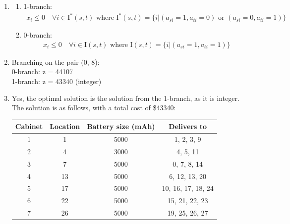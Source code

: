 \documentclass[10pt,a4paper]{article}
\begin{document}
\begin{enumerate}
\item 
\begin{enumerate}
	\item 1-branch:
	\begin{align*}
		x_i \leq 0 \quad \forall i \in \text{I}^*(s, t) \text{ where } \text{I}^*(s, t) = \{i | (a_{si} = 1, a_{ti} = 0) \text{ or } (a_{si} = 0, a_{ti} = 1)\}
	\end{align*}
	\item 0-branch:
	\begin{align*}
	x_i \leq 0 \quad \forall i \in \text{I}(s, t) \text{ where } \text{I}(s, t) = \{i | (a_{si} = 1, a_{ti} = 1)\}
	\end{align*}
\end{enumerate}

\item 
Branching on the pair (0, 8): \\
0-branch: z = 44107 \\
1-branch: z = 43340 (integer)

\item 
Yes, the optimal solution is the solution from the 1-branch, as it is integer. The solution is as follows, with a total cost of \$43340:

\begin{tabular}{|c|c|c|c|}
	\hline 
	Cabinet & Location & Battery size (mAh) & Delivers to \\ 
	\hline 
	1 & 1 & 5000 & 1, 2, 3, 9 \\ 
	\hline 
	2 & 4 & 3000 & 4, 5, 11 \\ 
	\hline 
	3 & 7 & 5000 & 0, 7, 8, 14 \\ 
	\hline 
	4 & 13 & 5000 & 6, 12, 13, 20 \\ 
	\hline 
	5 & 17 & 5000 & 10, 16, 17, 18, 24 \\ 
	\hline 
	6 & 22 & 5000 & 15, 21, 22, 23 \\ 
	\hline 
	7 & 26 & 5000 & 19, 25, 26, 27 \\ 
	\hline 
\end{tabular} 
\end{enumerate}
\end{document}
